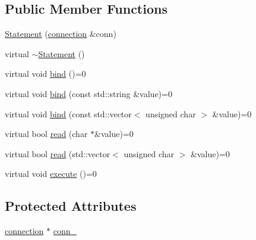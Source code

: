 \subsection*{Public Member Functions}
\begin{DoxyCompactItemize}
\item 
\hyperlink{classdbo_1_1stmt_1_1_statement_a6442da91d6cab533b92efdd2cb09bdff}{Statement} (\hyperlink{classdbo_1_1connection}{connection} \&conn)
\item 
virtual \hyperlink{classdbo_1_1stmt_1_1_statement_a57fdfef84b5f92d83850f6467b46012a}{$\sim$\+Statement} ()
\item 
virtual void \hyperlink{classdbo_1_1stmt_1_1_statement_a1699d7873785908a99211c91350cd376}{bind} ()=0
\item 
virtual void \hyperlink{classdbo_1_1stmt_1_1_statement_a8f2897467f5fccaec72ffe5ad797a8a3}{bind} (const std\+::string \&value)=0
\item 
virtual void \hyperlink{classdbo_1_1stmt_1_1_statement_a3f4f506b3df6f2d8667fa2900a662ee4}{bind} (const std\+::vector$<$ unsigned char $>$ \&value)=0
\item 
virtual bool \hyperlink{classdbo_1_1stmt_1_1_statement_a98ea71bb3c771dc5831b39d74035eb6b}{read} (char $\ast$\&value)=0
\item 
virtual bool \hyperlink{classdbo_1_1stmt_1_1_statement_a45864352cde548530425119915b3a2ef}{read} (std\+::vector$<$ unsigned char $>$ \&value)=0
\item 
virtual void \hyperlink{classdbo_1_1stmt_1_1_statement_af8e1a95b6c0c8b8ac6f5a25f4c48bf5e}{execute} ()=0
\end{DoxyCompactItemize}
\subsection*{Protected Attributes}
\begin{DoxyCompactItemize}
\item 
\hyperlink{classdbo_1_1connection}{connection} $\ast$ \hyperlink{classdbo_1_1stmt_1_1_statement_ae2fbf1f27c829b348afa751e7d04f934}{conn\+\_\+}
\end{DoxyCompactItemize}


